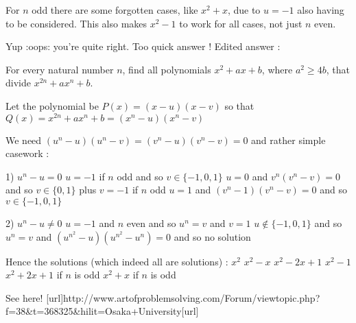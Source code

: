 \begin{solution}
	For $n$ odd there are some forgotten cases, like $x^2 + x$, due to $u=-1$ also having to be considered. This also makes $x^2 - 1$ to work for all cases, not just $n$ even.
\end{solution}



\begin{solution}
	Yup :oops: you're quite right.
Too quick answer !
Edited answer :
\begin{tcolorbox}For every natural number $n$, find all polynomials $x^2+ax+b$, where $a^2 \geq 4b$, that divide $x^{2n} + ax^n + b$.\end{tcolorbox}
Let the polynomial be $P(x)=(x-u)(x-v)$ so that $Q(x)=x^{2n}+ax^n+b=(x^n-u)(x^n-v)$

We need $(u^n-u)(u^n-v)=(v^n-u)(v^n-v)=0$ and rather simple casework :

1) $u^n-u=0$
$u=-1$ if $n$ odd and so $v\in\{-1,0,1\}$
$u=0$ and $v^n(v^n-v)=0$ and so $v\in\{0,1\}$ plus $v=-1$ if $n$ odd
$u=1$ and $(v^n-1)(v^n-v)=0$ and so $v\in\{-1,0,1\}$ 

2) $u^n-u\ne 0$
$u=-1$ and $n$ even and so $u^n=v$ and $v=1$ 
$u\notin\{-1,0,1\}$ and so $u^n=v$ and $(u^{n^2}-u)(u^{n^2}-u^n)=0$ and so no solution

Hence the solutions (which indeed all are solutions) :
$x^2$
$x^2-x$
$x^2-2x+1$
$x^2-1$
$x^2+2x+1$ if $n$ is odd
$x^2+x$ if $n$ is odd
\end{solution}



\begin{solution}
	See here! [url]http://www.artofproblemsolving.com/Forum/viewtopic.php?f=38&t=368325&hilit=Osaka+University[\/url]
\end{solution}



